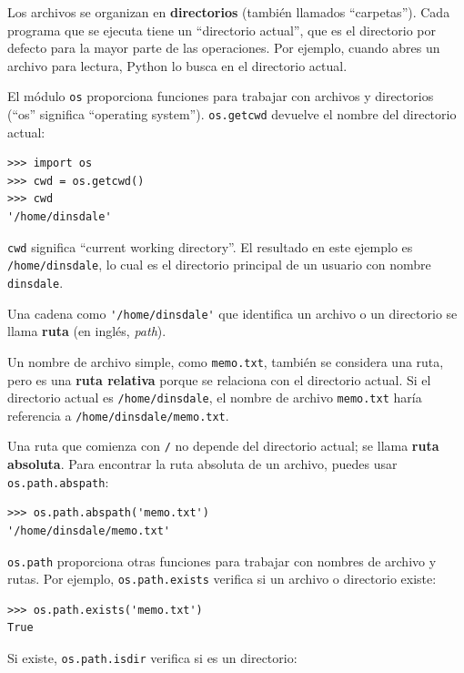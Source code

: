 \documentclass[10pt]{book}
\begin{document}
Los archivos se organizan en {\bf directorios} (también llamados ``carpetas'').
Cada programa que se ejecuta tiene un ``directorio actual'', que es el
directorio por defecto para la mayor parte de las operaciones.
Por ejemplo, cuando abres un archivo para lectura, Python lo busca en el
directorio actual.

El módulo {\tt os} proporciona funciones para trabajar con archivos y
directorios (``os'' significa ``operating system'').  {\tt os.getcwd}
devuelve el nombre del directorio actual:

\begin{verbatim}
>>> import os
>>> cwd = os.getcwd()
>>> cwd
'/home/dinsdale'
\end{verbatim}
%
{\tt cwd} significa ``current working directory''.  El resultado en
este ejemplo es {\tt /home/dinsdale}, lo cual es el directorio principal de un
usuario con nombre {\tt dinsdale}.

Una cadena como \verb"'/home/dinsdale'" que identifica un archivo o un
directorio se llama {\bf ruta} (en inglés, {\em path}).

Un nombre de archivo simple, como {\tt memo.txt}, también se considera una ruta,
pero es una {\bf ruta relativa} porque se relaciona con el directorio
actual.  Si el directorio actual es {\tt /home/dinsdale}, el
nombre de archivo {\tt memo.txt} haría referencia a {\tt /home/dinsdale/memo.txt}.
 
 

Una ruta que comienza con {\tt /} no depende del directorio
actual; se llama {\bf ruta absoluta}.  Para encontrar la ruta
absoluta de un archivo, puedes usar {\tt os.path.abspath}:

\begin{verbatim}
>>> os.path.abspath('memo.txt')
'/home/dinsdale/memo.txt'
\end{verbatim}
%
{\tt os.path} proporciona otras funciones para trabajar con nombres de archivo
y rutas.  Por ejemplo,
{\tt os.path.exists} verifica
si un archivo o directorio existe:

\begin{verbatim}
>>> os.path.exists('memo.txt')
True
\end{verbatim}
%
Si existe, {\tt os.path.isdir} verifica si es un directorio:
\end{document}
